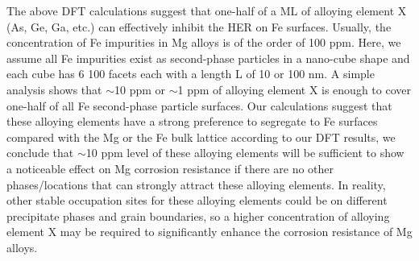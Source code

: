 The above DFT calculations suggest that one-half of a \ac{ML} of alloying element X (As, Ge, Ga, etc.) can effectively inhibit the HER on Fe surfaces. Usually, the concentration of Fe impurities in Mg alloys is of the order of 100 ppm. Here, we assume all Fe impurities exist as second-phase particles in a nano-cube shape and each cube has 6 {100} facets each with a length L of 10 or 100 nm. A simple analysis shows that $\sim$10 ppm or $\sim$1 ppm of alloying element X is enough to cover one-half of all Fe second-phase particle surfaces. Our calculations suggest that these alloying elements have a strong preference to segregate to Fe surfaces compared with the Mg or the Fe bulk lattice according to our DFT results, we conclude that $\sim$10 ppm level of these alloying elements will be sufficient to show a noticeable effect on Mg corrosion resistance if there are no other phases/locations that can strongly attract these alloying elements. In reality, other stable occupation sites for these alloying elements could be on different precipitate phases and grain boundaries, so a higher concentration of alloying element X may be required to significantly enhance the corrosion resistance of Mg alloys.